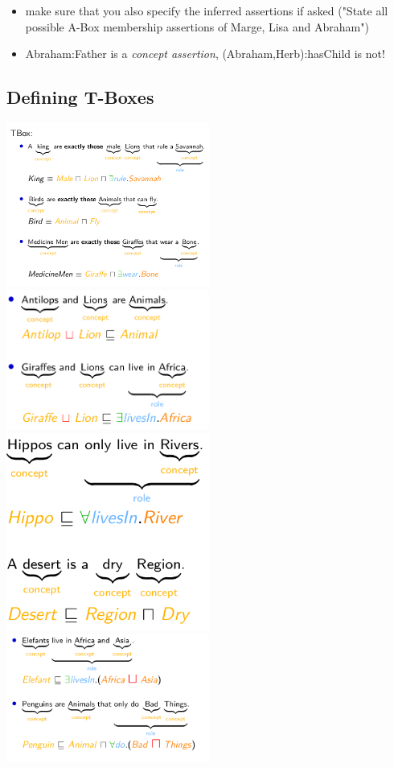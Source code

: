 \documentclass[conference]{styles/acmsiggraph}
\begin{document}
\begin{itemize}
    \item make sure that you also specify the inferred assertions if asked ("State all possible A-Box membership assertions of Marge, Lisa and Abraham")
    \item Abraham:Father is a \textit{concept assertion}, (Abraham,Herb):hasChild is not!
\end{itemize}

\subsection{Defining T-Boxes}

\includegraphics[width=0.5\textwidth]{imgs/tbox-ex.png}
\includegraphics[width=0.5\textwidth]{imgs/tbox-ex2.png}\\
\includegraphics[width=0.5\textwidth]{imgs/tbox-ex3.png}
\includegraphics[width=0.5\textwidth]{imgs/tbox-ex4.png}\\
\end{document}
